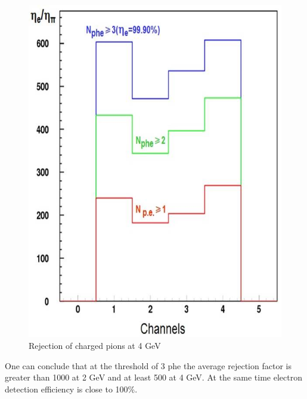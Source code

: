 \begin{figure}[!ht]
    \centering
    \includegraphics[width=1.0\linewidth,trim={0.0cm 0.0cm 0.0cm 0.0cm},clip]{images/Pion_rejection_4GeV.jpg}
    \caption{Rejection of charged pions at 4 GeV}
    \label{fig:Pion_rejection_4GeV}
\end{figure}

One can conclude that at the threshold of 3 phe the average rejection factor is greater than 1000 at 2 GeV and at least 500 at 4 GeV. At the same time electron detection efficiency is close to 100\%.
